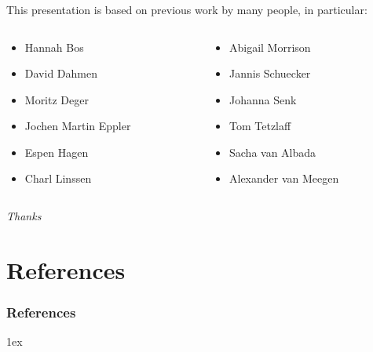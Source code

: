 \documentclass[8pt,t,usepdftitle=false]{beamer}
\begin{document}
\begin{frame}[plain]
  \frametitle{\ttl}
  This presentation is based on previous work by many people, in particular:\\[3ex]
  \begin{columns}
    \begin{column}{0.5\linewidth}
      \begin{itemize}
        \item Hannah Bos
        \item David Dahmen
        \item Moritz Deger
        \item Jochen Martin Eppler
        \item Espen Hagen
        \item Charl Linssen          
      \end{itemize}
    \end{column}
    \begin{column}{0.5\linewidth}
      \begin{itemize}
        \item Abigail Morrison        
        \item Jannis Schuecker
        \item Johanna Senk
        \item Tom Tetzlaff
        \item Sacha van Albada
        \item Alexander van Meegen          
      \end{itemize}
    \end{column}
  \end{columns}
\end{frame}
\begin{frame}
  \begin{center}
    \vspace*{\fill}
    \LARGE\emph{\it Thanks}
    \vspace*{\fill}
  \end{center}
\end{frame}
\def\ttl{References}\section*{\ttl}
\begin{frame}  
  \frametitle{\ttl}
  \bibitemsep1ex
  \renewcommand{\bibfont}{\normalfont\small}
  \printbibliography
\end{frame}
\end{document}
